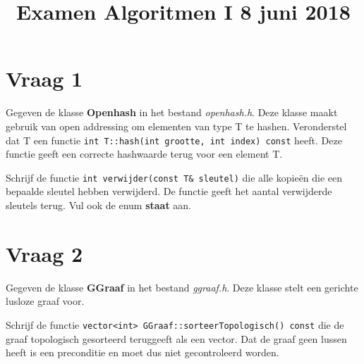 \documentclass{article}
\begin{document}
\title{Examen Algoritmen I 8 juni 2018}
\date{}
\author{}
\maketitle

\section{Vraag 1}
    Gegeven de klasse \textbf{Openhash} in het bestand \textit{openhash.h}. Deze klasse maakt gebruik van open addressing om elementen van type T te hashen. Veronderstel dat T een functie \texttt{int T::hash(int grootte, int index) const} heeft. Deze functie geeft een correcte hashwaarde terug voor een element T. 
    
    Schrijf de functie \texttt{int verwijder(const T\& sleutel)} die alle kopie\"en die een bepaalde sleutel hebben verwijderd. De functie geeft het aantal verwijderde sleutels terug. Vul ook de enum \textbf{staat} aan.

\section{Vraag 2}
    Gegeven de klasse \textbf{GGraaf} in het bestand \textit{ggraaf.h}. Deze klasse stelt een gerichte lusloze graaf voor.
    
    Schrijf de functie \texttt{vector<int> GGraaf::sorteerTopologisch() const} die de graaf topologisch gesorteerd teruggeeft als een vector. Dat de graaf geen lussen heeft is een preconditie en moet dus niet gecontroleerd worden.
\end{document}
